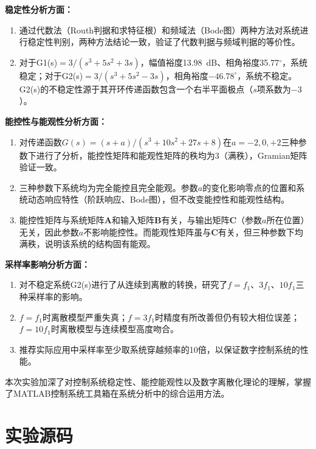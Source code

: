 \documentclass{../common/SCNU_Experimental_Report}
\begin{document}
\textbf{稳定性分析方面：}
\begin{enumerate}
    \item 通过代数法（Routh判据和求特征根）和频域法（Bode图）两种方法对系统进行稳定性判别，两种方法结论一致，验证了代数判据与频域判据的等价性。
    \item 对于G1(s)$= 3/(s^3 + 5s^2 + 3s)$，幅值裕度13.98~dB、相角裕度35.77$^\circ$，系统稳定；对于G2(s)$= 3/(s^3 + 5s^2 - 3s)$，相角裕度$-46.78^\circ$，系统不稳定。G2(s)的不稳定性源于其开环传递函数包含一个右半平面极点（$s$项系数为$-3$）。
\end{enumerate}

\textbf{能控性与能观性分析方面：}
\begin{enumerate}
    \item 对传递函数$G(s) = (s + a)/(s^3 + 10s^2 + 27s + 8)$在$a = -2, 0, +2$三种参数下进行了分析，能控性矩阵和能观性矩阵的秩均为3（满秩），Gramian矩阵验证一致。
    \item 三种参数下系统均为完全能控且完全能观。参数$a$的变化影响零点的位置和系统动态响应特性（阶跃响应、Bode图），但不改变能控性和能观性结构。
    \item 能控性矩阵与系统矩阵$\boldsymbol{A}$和输入矩阵$\boldsymbol{B}$有关，与输出矩阵$\boldsymbol{C}$（参数$a$所在位置）无关，因此参数$a$不影响能控性。而能观性矩阵虽与$\boldsymbol{C}$有关，但三种参数下均满秩，说明该系统的结构固有能观。
\end{enumerate}

\textbf{采样率影响分析方面：}
\begin{enumerate}
    \item 对不稳定系统G2(s)进行了从连续到离散的转换，研究了$f = f_1$、$3f_1$、$10f_1$三种采样率的影响。
    \item $f = f_1$时离散模型严重失真；$f = 3f_1$时精度有所改善但仍有较大相位误差；$f = 10f_1$时离散模型与连续模型高度吻合。
    \item 推荐实际应用中采样率至少取系统穿越频率的10倍，以保证数字控制系统的性能。
\end{enumerate}

本次实验加深了对控制系统稳定性、能控能观性以及数字离散化理论的理解，掌握了MATLAB控制系统工具箱在系统分析中的综合运用方法。

\section{实验源码}
\end{document}
